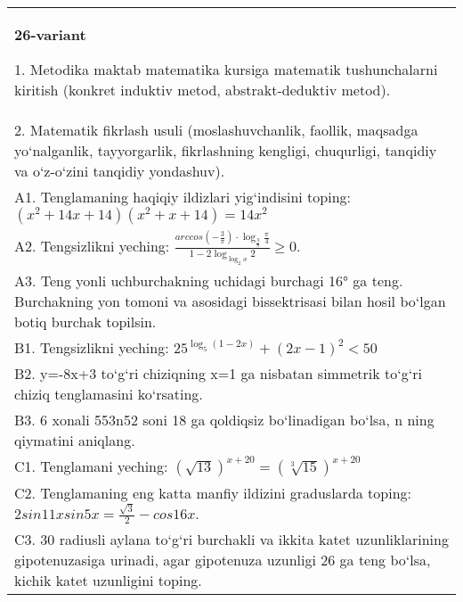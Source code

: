 \documentclass{article}
\begin{document}
\begin{tabular}{m{17cm}}
\textbf{26-variant}

1. Metodika maktab matematika kursiga matematik tushunchalarni kiritish (konkret induktiv metod, abstrakt-deduktiv metod). \\
2. Matematik fikrlash usuli (moslashuvchanlik, faollik, maqsadga yo‘nalganlik, tayyorgarlik, fikrlashning kengligi, chuqurligi, tanqidiy va o‘z-o‘zini tanqidiy yondashuv). \\
A1. Tenglamaning haqiqiy ildizlari yig‘indisini toping: \((x^2 + 14x + 14) (x^2 + x + 14) = 14x^2\) \\
A2. Tengsizlikni yeching: \(\frac{arccos (- \frac{3}{\pi}) \cdot \log_{\frac{3}{\pi}}\frac{\pi}{4}}{1 - 2\log_{\log_{2}x}2} \geq 0\). \\
A3. Teng yonli uchburchakning uchidagi burchagi 16° ga teng. Burchakning yon tomoni va asosidagi bissektrisasi bilan hosil bo‘lgan botiq burchak topilsin. \\
B1. Tengsizlikni yeching: \(25^{\log_{5}{ (1 - 2x) }} + { (2x - 1) }^{2} < 50\) \\
B2. y=-8x+3 to‘g‘ri chiziqning x=1 ga nisbatan simmetrik to‘g‘ri chiziq tenglamasini ko‘rsating. \\
B3. 6 xonali 553n52 soni 18 ga qoldiqsiz bo‘linadigan bo‘lsa, n ning qiymatini aniqlang. \\
C1. Tenglamani yeching: \((\sqrt{13}) ^{x + 20} = (\sqrt[3]{15}) ^{x + 20}\) \\
C2. Tenglamaning eng katta manfiy ildizini graduslarda toping: \(2sin11xsin5x = \frac{\sqrt{3}}{2} - cos16x\). \\
C3. 30 radiusli aylana to‘g‘ri burchakli va ikkita katet uzunliklarining gipotenuzasiga urinadi, agar gipotenuza uzunligi 26 ga teng bo‘lsa, kichik katet uzunligini toping. \\

\end{tabular}
\vspace{1cm}
\end{document}
